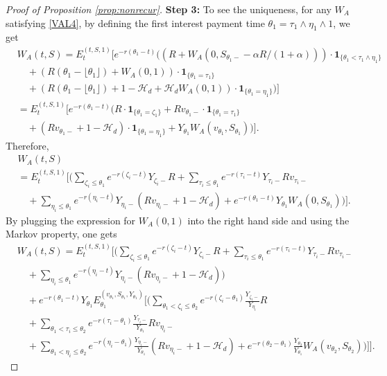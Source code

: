 \documentclass[draft, noinfoline]{ectaart}
\numberwithin{equation}{section}
\theoremstyle{plain}
\begin{document}
\begin{appendices}
\begin{proof}[Proof of Proposition \ref{prop:nonrecur}]
	{\flushleft\bf Step 3:} To see the uniqueness, for any $W_A$ satisfying \eqref{VAL4}, by defining the first interest payment time $\theta_1=\tau_1\land\eta_1\land1$, we get
	\begin{align*}
	&W_A(t,S)=E_t^{(t,S,1)}\Bigg[e^{-r(\theta_1-t)}\Bigg((R+W_A(0,S_{\theta_1-}-\alpha R/(1+\alpha)))\cdot\mathbf{1}_{\{\theta_1<\tau_1\land\eta_1\}}\\
	&\quad+(R(\theta_1-\lfloor\theta_1\rfloor)+W_A(0,1))\cdot\mathbf{1}_{\{\theta_1=\tau_1\}}\\
	&\quad+(R(\theta_1-\lfloor\theta_1\rfloor)+1-\mathcal{H}_d+\mathcal{H}_d W_A(0,1))\cdot \mathbf{1}_{\{\theta_1=\eta_1\}}\Bigg)\Bigg]\\
	&=E_t^{(t,S,1)}\Bigg[e^{-r(\theta_1-t)}\Bigg(R\cdot\mathbf{1}_{\{\theta_1=\zeta_1\}}+Rv_{\theta_1-}\cdot\mathbf{1}_{\{\theta_1=\tau_1\}}\\
	&\quad+(Rv_{\theta_1-}+1-\mathcal{H}_d)\cdot \mathbf{1}_{\{\theta_1=\eta_1\}}+Y_{\theta_1} W_A(v_{\theta_1},S_{\theta_1})\Bigg)\Bigg].
	\end{align*}
	Therefore,
	\begin{align*}
	&W_A(t,S) \\
	&=E_t^{(t,S,1)}\Bigg[\Bigg(\sum_{\zeta_i\le\theta_1}e^{-r(\zeta_i-t)}Y_{\zeta_i-}R+\sum_{\tau_i\le\theta_1}e^{-r(\tau_i-t)}Y_{\tau_i-}Rv_{\tau_i-}\\
	&\quad+\sum_{\eta_i\le\theta_1}e^{-r(\eta_i-t)}Y_{\eta_i-}(Rv_{\eta_i-}+1-\mathcal{H}_d)+e^{-r(\theta_1-t)}Y_{\theta_1} W_A(0,S_{\theta_1})\Bigg)\Bigg].
	\end{align*}
	By plugging the expression for $W_A(0,1)$ into the right hand side and using the Markov property, one gets
	\begin{align*}
	&W_A(t,S)=E_t^{(t,S,1)}\Bigg[\Bigg(\sum_{\zeta_i\le\theta_1}e^{-r(\zeta_i-t)}Y_{\zeta_i-}R+\sum_{\tau_i\le\theta_1}e^{-r(\tau_i-t)}Y_{\tau_i-}Rv_{\tau_i-}\\
	&\quad+\sum_{\eta_i\le\theta_1}e^{-r(\eta_i-t)}Y_{\eta_i-}(Rv_{\eta_i-}+1-\mathcal{H}_d)\Bigg)\\
	&\quad+e^{-r(\theta_1-t)}Y_{\theta_1} E_{\theta_1}^{(v_{\theta_1},S_{\theta_1},Y_{\theta_1})}\Bigg[\Bigg(\sum_{\theta_1<\zeta_i\le\theta_2}e^{-r(\zeta_i-\theta_1)}\frac{Y_{\zeta_i-}}{Y_{\eta_i}}R   \\
	&\quad+\sum_{\theta_1<\tau_i\le\theta_2}e^{-r(\tau_i-\theta_1)}\frac{Y_{\tau_i-}}{Y_{\theta_1}}Rv_{\eta_i-}\\
	&\quad+\sum_{\theta_1<\eta_i\le\theta_2}e^{-r(\eta_i-\theta_1)}\frac{Y_{\eta_i-}}{Y_{\theta_1}}(Rv_{\eta_i-}+1-\mathcal{H}_d)+e^{-r(\theta_2-\theta_1)}\frac{Y_{\theta_2}}{Y_{\theta_1}} W_A(v_{\theta_2},S_{\theta_2})\Bigg)\Bigg]\Bigg].

\end{align*}
\end{proof}
\end{appendices}
\end{document}
